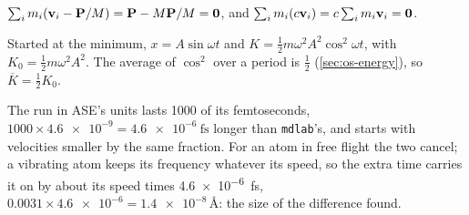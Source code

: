 $\sum_im_i(\bm{\mathrm{v}}_i - \bm{\mathrm{P}}/M) = \bm{\mathrm{P}} -
M\bm{\mathrm{P}}/M = \bm{\mathrm{0}}$, and $\sum_im_i(c\bm{\mathrm{v}}_i) = c\sum_im_i\bm{\mathrm{v}}_i =
\bm{\mathrm{0}}$.

Started at the minimum, $x = A\sin\omega t$ and
$K = \frac12m\omega^2A^2\cos^2\omega t$, with $K_0 = \frac12m\omega^2A^2$.
The average of $\cos^2$ over a period is $\frac12$ (\cref{sec:os-energy}),
so $\overline{K} = \frac12K_0$.

The run in ASE's units lasts 1000 of its
femtoseconds, $1000\times\num{4.6e-9} = \SI{4.6e-6}{\femto\second}$
longer than \texttt{mdlab}'s, and starts with velocities smaller by the
same fraction. For an atom in free flight the two cancel; a vibrating
atom keeps its frequency whatever its speed, so the extra time carries it
on by about its speed times \SI{4.6e-6}{\femto\second}, $0.0031\times
\num{4.6e-6} = \num{1.4e-8}$\,\AA: the size of the difference found.
